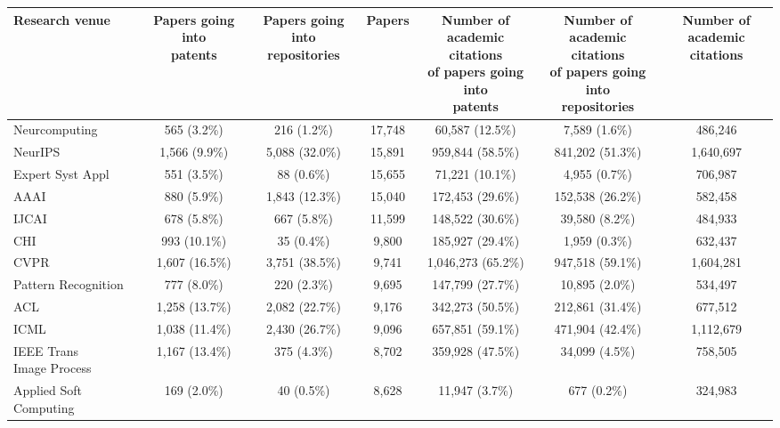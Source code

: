     \tiny

\begin{tabular}{l|ccc|ccc}
\toprule
Research venue & \makecell{Papers going into \\ patents} & \makecell{Papers going into \\ repositories} &   Papers & \makecell{Number of \\academic citations \\  of papers going into \\ patents} & \makecell{Number of \\academic citations \\  of papers going into \\ repositories} & \makecell{Number of \\academic citations} \\
\midrule
Neurcomputing & 565 (3.2\%) & 216 (1.2\%) & 17,748 & 60,587 (12.5\%) & 7,589 (1.6\%) & 486,246 \\
NeurIPS & 1,566 (9.9\%) & 5,088 (32.0\%) & 15,891 & 959,844 (58.5\%) & 841,202 (51.3\%) & 1,640,697 \\
Expert Syst Appl & 551 (3.5\%) & 88 (0.6\%) & 15,655 & 71,221 (10.1\%) & 4,955 (0.7\%) & 706,987 \\
AAAI & 880 (5.9\%) & 1,843 (12.3\%) & 15,040 & 172,453 (29.6\%) & 152,538 (26.2\%) & 582,458 \\
IJCAI & 678 (5.8\%) & 667 (5.8\%) & 11,599 & 148,522 (30.6\%) & 39,580 (8.2\%) & 484,933 \\
CHI & 993 (10.1\%) & 35 (0.4\%) & 9,800 & 185,927 (29.4\%) & 1,959 (0.3\%) & 632,437 \\
CVPR & 1,607 (16.5\%) & 3,751 (38.5\%) & 9,741 & 1,046,273 (65.2\%) & 947,518 (59.1\%) & 1,604,281 \\
Pattern Recognition & 777 (8.0\%) & 220 (2.3\%) & 9,695 & 147,799 (27.7\%) & 10,895 (2.0\%) & 534,497 \\
ACL & 1,258 (13.7\%) & 2,082 (22.7\%) & 9,176 & 342,273 (50.5\%) & 212,861 (31.4\%) & 677,512 \\
ICML & 1,038 (11.4\%) & 2,430 (26.7\%) & 9,096 & 657,851 (59.1\%) & 471,904 (42.4\%) & 1,112,679 \\
\makecell[l]{IEEE Trans \\ Image Process} & 1,167 (13.4\%) & 375 (4.3\%) & 8,702 & 359,928 (47.5\%) & 34,099 (4.5\%) & 758,505 \\
Applied Soft Computing & 169 (2.0\%) & 40 (0.5\%) & 8,628 & 11,947 (3.7\%) & 677 (0.2\%) & 324,983 \\

\end{tabular}
